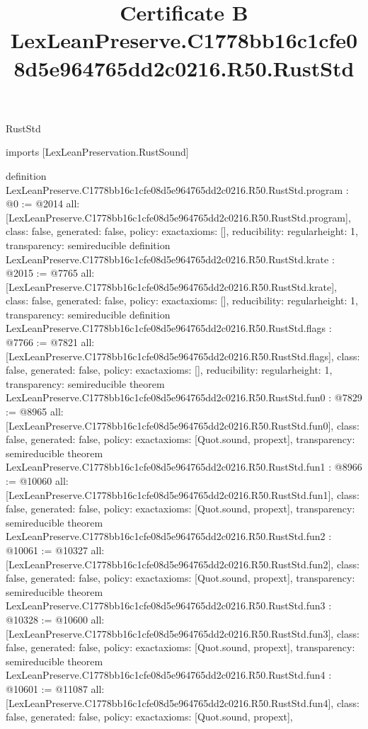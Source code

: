 \begin{lexlean}{RustStd}
\title{Certificate B LexLeanPreserve.C1778bb16c1cfe08d5e964765dd2c0216.R50.RustStd}
\begin{coremodule}
imports [LexLeanPreservation.RustSound]

definition LexLeanPreserve.C1778bb16c1cfe08d5e964765dd2c0216.R50.RustStd.program : @0 := @2014 {
  all: [LexLeanPreserve.C1778bb16c1cfe08d5e964765dd2c0216.R50.RustStd.program],
  class: false,
  generated: false,
  policy: exact{axioms: []},
  reducibility: regular{height: 1},
  transparency: semireducible
}
definition LexLeanPreserve.C1778bb16c1cfe08d5e964765dd2c0216.R50.RustStd.krate : @2015 := @7765 {
  all: [LexLeanPreserve.C1778bb16c1cfe08d5e964765dd2c0216.R50.RustStd.krate],
  class: false,
  generated: false,
  policy: exact{axioms: []},
  reducibility: regular{height: 1},
  transparency: semireducible
}
definition LexLeanPreserve.C1778bb16c1cfe08d5e964765dd2c0216.R50.RustStd.flags : @7766 := @7821 {
  all: [LexLeanPreserve.C1778bb16c1cfe08d5e964765dd2c0216.R50.RustStd.flags],
  class: false,
  generated: false,
  policy: exact{axioms: []},
  reducibility: regular{height: 1},
  transparency: semireducible
}
theorem LexLeanPreserve.C1778bb16c1cfe08d5e964765dd2c0216.R50.RustStd.fun0 : @7829 := @8965 {
  all: [LexLeanPreserve.C1778bb16c1cfe08d5e964765dd2c0216.R50.RustStd.fun0],
  class: false,
  generated: false,
  policy: exact{axioms: [Quot.sound, propext]},
  transparency: semireducible
}
theorem LexLeanPreserve.C1778bb16c1cfe08d5e964765dd2c0216.R50.RustStd.fun1 : @8966 := @10060 {
  all: [LexLeanPreserve.C1778bb16c1cfe08d5e964765dd2c0216.R50.RustStd.fun1],
  class: false,
  generated: false,
  policy: exact{axioms: [Quot.sound, propext]},
  transparency: semireducible
}
theorem LexLeanPreserve.C1778bb16c1cfe08d5e964765dd2c0216.R50.RustStd.fun2 : @10061 := @10327 {
  all: [LexLeanPreserve.C1778bb16c1cfe08d5e964765dd2c0216.R50.RustStd.fun2],
  class: false,
  generated: false,
  policy: exact{axioms: [Quot.sound, propext]},
  transparency: semireducible
}
theorem LexLeanPreserve.C1778bb16c1cfe08d5e964765dd2c0216.R50.RustStd.fun3 : @10328 := @10600 {
  all: [LexLeanPreserve.C1778bb16c1cfe08d5e964765dd2c0216.R50.RustStd.fun3],
  class: false,
  generated: false,
  policy: exact{axioms: [Quot.sound, propext]},
  transparency: semireducible
}
theorem LexLeanPreserve.C1778bb16c1cfe08d5e964765dd2c0216.R50.RustStd.fun4 : @10601 := @11087 {
  all: [LexLeanPreserve.C1778bb16c1cfe08d5e964765dd2c0216.R50.RustStd.fun4],
  class: false,
  generated: false,
  policy: exact{axioms: [Quot.sound, propext]},
}
\end{coremodule}
\end{lexlean}
